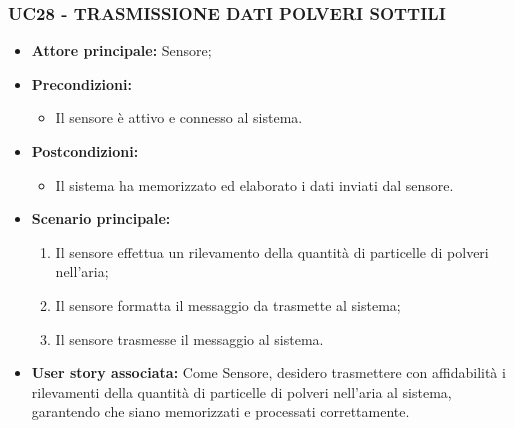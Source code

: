 \subsubsection{UC28 - TRASMISSIONE DATI POLVERI SOTTILI}
\begin{itemize}
    \item \textbf{Attore principale:} Sensore;
    \item \textbf{Precondizioni:}
        \begin{itemize}
            \item Il sensore è attivo e connesso al sistema. 
        \end{itemize}
    \item \textbf{Postcondizioni:}
        \begin{itemize}
            \item Il sistema ha memorizzato ed elaborato i dati inviati dal sensore.
        \end{itemize}
    \item \textbf{Scenario principale:}
        \begin{enumerate}
            \item Il sensore effettua un rilevamento della quantità di particelle di polveri nell'aria;
            \item Il sensore formatta il messaggio da trasmette al sistema;
            \item Il sensore trasmesse il messaggio al sistema.
        \end{enumerate}
    \item \textbf{User story associata:}
    Come Sensore, desidero trasmettere con affidabilità i rilevamenti della quantità di particelle di polveri nell'aria al sistema, garantendo che siano memorizzati e processati correttamente.
\end{itemize}

